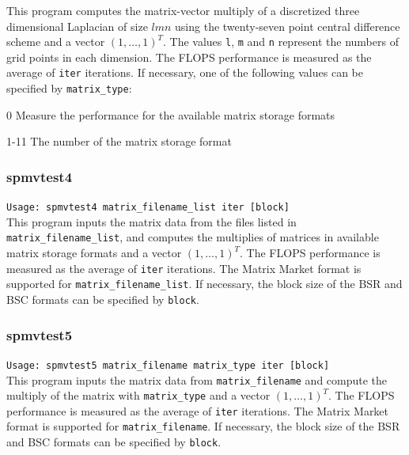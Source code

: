 \documentclass[a4paper]{article}
\newcommand{\namelistlabel}[1]{\mbox{#1}\hfill}
\newenvironment{namelist}[1]{%
\begin{list}{}
  {\let\makelabel\namelistlabel
  \settowidth{\labelwidth}{#1}
  \setlength{\leftmargin}{1.1\labelwidth}}
  }{%
\end{list}}
\begin{document}
This program computes the matrix-vector multiply of a 
discretized three dimensional Laplacian of size $lmn$ using 
the twenty-seven point central difference scheme and a vector $(1,\dots,1)^T$. 
The values {\tt l}, {\tt m} and {\tt n} represent the numbers of grid
points in each dimension. 
The FLOPS performance is measured as the average of {\tt iter}
iterations.
If necessary, one of the following values can be specified by {\tt matrix\_type}:
\begin{namelist}{XXXXXXXXXXXXXXXXXXXX}
\item[0] Measure the performance for the available matrix storage formats
\item[1-11] The number of the matrix storage format
\end{namelist}

\subsubsection{spmvtest4}

\verb+Usage: spmvtest4 matrix_filename_list iter [block]+\\

This program inputs the matrix data from the files listed in {\tt matrix\_filename\_list}, 
and computes the multiplies of matrices in available matrix 
storage formats and a vector $(1,\dots,1)^T$. 
The FLOPS performance is measured as the average of {\tt iter}
iterations. 
The Matrix Market format is supported for {\tt matrix\_filename\_list}. 
If necessary, the block size of the BSR and BSC formats can be specified
by {\tt block}.

\subsubsection{spmvtest5}

\verb+Usage: spmvtest5 matrix_filename matrix_type iter [block]+\\

This program inputs the matrix data from {\tt matrix\_filename} 
and compute the multiply of the matrix 
with \verb|matrix_type| and a vector $(1,\dots,1)^T$. 
The FLOPS performance is measured as the average of {\tt iter} iterations. 
The Matrix Market format is supported for {\tt matrix\_filename}. 
If necessary, the block size of the BSR and BSC formats can be specified by {\tt block}.
\end{document}
